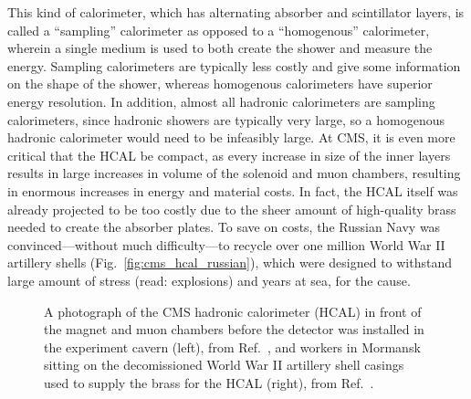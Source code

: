 This kind of calorimeter, which has alternating absorber and scintillator layers, is called a ``sampling'' calorimeter as opposed to a ``homogenous'' calorimeter, wherein a single medium is used to both create the shower and measure the energy. 
Sampling calorimeters are typically less costly and give some information on the shape of the shower, whereas homogenous calorimeters have superior energy resolution. 
In addition, almost all hadronic calorimeters are sampling calorimeters, since hadronic showers are typically very large, so a homogenous hadronic calorimeter would need to be infeasibly large. 
At CMS, it is even more critical that the HCAL be compact, as every increase in size of the inner layers results in large increases in volume of the solenoid and muon chambers, resulting in enormous increases in energy and material costs. 
In fact, the HCAL itself was already projected to be too costly due to the sheer amount of high-quality brass needed to create the absorber plates. 
To save on costs, the Russian Navy was convinced---without much difficulty---to recycle over one million World War II artillery shells (Fig.~\ref{fig:cms_hcal_russian}), which were designed to withstand large amount of stress (read: explosions) and years at sea, for the cause. 

\begin{figure}[htb]
    \centering
    \quad
    \caption{
        A photograph of the CMS hadronic calorimeter (HCAL) in front of the magnet and muon chambers before the detector was installed in the experiment cavern (left), from Ref.~\cite{Brice:1431485}, and workers in Mormansk sitting on the decomissioned World War II artillery shell casings used to supply the brass for the HCAL (right), from Ref.~\cite{GinterRussianDudes}.
    }
\end{figure}

